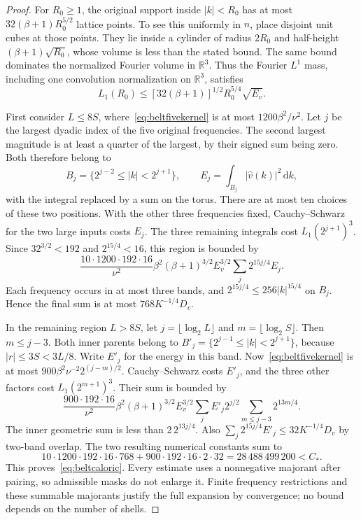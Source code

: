 \documentclass[11pt]{article}
\newcommand{\R}{\mathbb R}
\newcommand{\dd}{\,\mathrm d}
\begin{document}
\begin{proof}
For $R_0\geq1$, the original support inside $|k|<R_0$ has at most
$32(\beta+1)R_0^{5/2}$ lattice points. To see this uniformly in $n$,
place disjoint unit cubes at those points. They lie inside a cylinder
of radius $2R_0$ and half-height $(\beta+1)\sqrt{R_0}$, whose volume
is less than the stated bound. The same bound dominates the normalized
Fourier volume in $\R^3$. Thus the Fourier $L^1$ mass, including one
convolution normalization on $\R^3$, satisfies
\begin{equation}\label{eq:beltlone}
 L_1(R_0)\leq[32(\beta+1)]^{1/2}R_0^{5/4}\sqrt{E_v}.
\end{equation}

First consider $L\leq8S$, where~\eqref{eq:beltfivekernel} is at most
$1200\beta^2/\nu^2$. Let $j$ be the largest dyadic index of the
five original frequencies. The second largest magnitude is at least
a quarter of the largest, by their signed sum being zero. Both therefore
belong to
\[
 B_j=\{2^{j-2}\leq|k|<2^{j+1}\},\qquad
 E_j=\int_{B_j}|\widehat v(k)|^2\dd k,
\]
with the integral replaced by a sum on the torus. There are at most ten
choices of these two positions. With the other three frequencies fixed,
Cauchy--Schwarz for the two large inputs costs $E_j$. The three remaining
integrals cost $L_1(2^{j+1})^3$. Since $32^{3/2}<192$ and
$2^{15/4}<16$, this region is bounded by
\[
 \frac{10\cdot1200\cdot192\cdot16}{\nu^2}
  \beta^2(\beta+1)^{3/2}E_v^{3/2}
                      \sum_j2^{15j/4}E_j.
\]
Each frequency occurs in at most three bands, and
$2^{15j/4}\leq256|k|^{15/4}$ on $B_j$. Hence the final sum is at most
$768K^{-1/4}D_v$.

In the remaining region $L>8S$, let $j=\lfloor\log_2 L\rfloor$ and
$m=\lfloor\log_2 S\rfloor$. Then $m\leq j-3$. Both inner parents
belong to $B'_j=\{2^{j-1}\leq|k|<2^{j+1}\}$, because
$|r|\leq3S<3L/8$. Write $E'_j$ for the energy in this band.
Now~\eqref{eq:beltfivekernel} is at most
$900\beta^2\nu^{-2}2^{(j-m)/2}$. Cauchy--Schwarz costs $E'_j$,
and the three other factors cost $L_1(2^{m+1})^3$. Their sum is bounded by
\[
 \frac{900\cdot192\cdot16}{\nu^2}
  \beta^2(\beta+1)^{3/2}E_v^{3/2}
       \sum_j E'_j2^{j/2}\sum_{m\leq j-3}2^{13m/4}.
\]
The inner geometric sum is less than $2\,2^{13j/4}$.
Also $\sum_j2^{15j/4}E'_j\leq32K^{-1/4}D_v$ by two-band overlap.
The two resulting numerical constants sum to
\[
 10\cdot1200\cdot192\cdot16\cdot768
 +900\cdot192\cdot16\cdot2\cdot32
 =28\,488\,499\,200<C_*.
\]
This proves~\eqref{eq:beltcaloric}. Every estimate uses a nonnegative
majorant after pairing, so admissible masks do not enlarge it.
Finite frequency restrictions and these summable majorants justify
the full expansion by convergence; no bound depends on the number of shells.
\end{proof}
\end{document}
